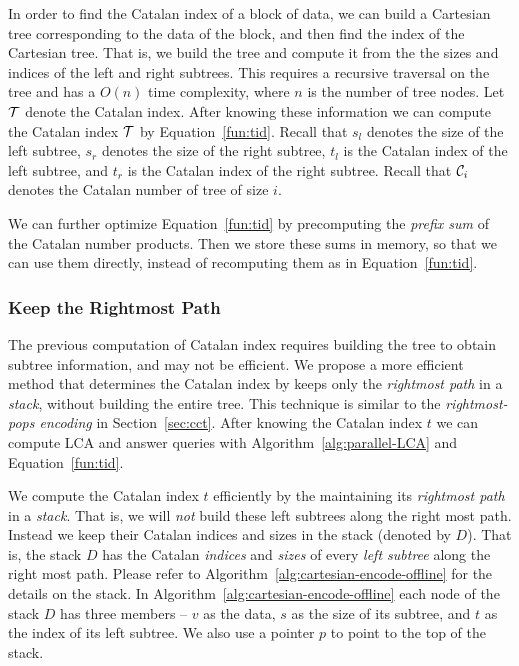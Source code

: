 In order to find the Catalan index of a block of data, we can build a
Cartesian tree corresponding to the data of the block, and then find
the index of the Cartesian tree.  That is, we build the tree and
compute it from the the sizes and indices of the left and right
subtrees.  This requires a recursive traversal on the tree and has a
$O(n)$ time complexity, where $n$ is the number of tree nodes.  Let
$\cal T$ denote the Catalan index.  After knowing these information we
can compute the Catalan index $\cal T$ by Equation~\ref{fun:tid}.
Recall that $s_l$ denotes the size of the left subtree, $s_r$ denotes
the size of the right subtree, $t_l$ is the Catalan index of the left
subtree, and $t_r$ is the Catalan index of the right subtree.  Recall
that ${\cal C}_i$ denotes the Catalan number of tree of size $i$.

% 



We can further optimize Equation~\ref{fun:tid} by precomputing the
{\em prefix sum} of the Catalan number products.  Then we store these
sums in memory, so that we can use them directly, instead of
recomputing them as in Equation~\ref{fun:tid}.  


\subsubsection{Keep the Rightmost Path}

The previous computation of Catalan index requires building the tree
to obtain subtree information, and may not be efficient.  We propose a
more efficient method that determines the Catalan index by keeps only
the {\em rightmost path} in a {\em stack}, without building the entire
tree.  This technique is similar to the {\em rightmost-pops encoding}
in Section~\ref{sec:cct}.  After knowing the Catalan index $t$ we can
compute LCA and answer queries with Algorithm~\ref{alg:parallel-LCA}
and Equation~\ref{fun:tid}.

We compute the Catalan index $t$ efficiently by the maintaining its
{\em rightmost path} in a {\em stack}.  That is, we will {\em not}
build these left subtrees along the right most path.  Instead we keep
their Catalan indices and sizes in the stack (denoted by $D$).  That
is, the stack $D$ has the Catalan {\em indices} and {\em sizes} of
every {\em left subtree} along the right most path.  Please refer to
Algorithm~\ref{alg:cartesian-encode-offline} for the details on the
stack.  In Algorithm~\ref{alg:cartesian-encode-offline} each node of
the stack $D$ has three members -- $v$ as the data, $s$ as the size of
its subtree, and $t$ as the index of its left subtree.  We also use a
pointer $p$ to point to the top of the stack.

